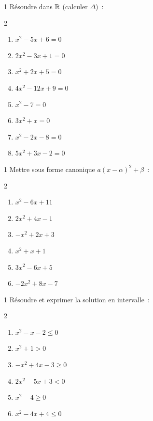 \begin{exo}{1}
R\'esoudre dans $\mathbb{R}$ (calculer $\Delta$)~:
\begin{multicols}{2}
\begin{enumerate}
  \item $x^2 - 5x + 6 = 0$
  \item $2x^2 - 3x + 1 = 0$
  \item $x^2 + 2x + 5 = 0$
  \item $4x^2 - 12x + 9 = 0$
  \item $x^2 - 7 = 0$
  \item $3x^2 + x = 0$
  \item $x^2 - 2x - 8 = 0$
  \item $5x^2 + 3x - 2 = 0$
\end{enumerate}
\end{multicols}
\end{exo}

\begin{exo}{1}
Mettre sous forme canonique $a(x-\alpha)^2+\beta$~:
\begin{multicols}{2}
\begin{enumerate}
  \item $x^2 - 6x + 11$
  \item $2x^2 + 4x - 1$
  \item $-x^2 + 2x + 3$
  \item $x^2 + x + 1$
  \item $3x^2 - 6x + 5$
  \item $-2x^2 + 8x - 7$
\end{enumerate}
\end{multicols}
\end{exo}

\begin{exo}{1}
R\'esoudre et exprimer la solution en intervalle~:
\begin{multicols}{2}
\begin{enumerate}
  \item $x^2 - x - 2 \leq 0$
  \item $x^2 + 1 > 0$
  \item $-x^2 + 4x - 3 \geq 0$
  \item $2x^2 - 5x + 3 < 0$
  \item $x^2 - 4 \geq 0$
  \item $x^2 - 4x + 4 \leq 0$
\end{enumerate}
\end{multicols}
\end{exo}

